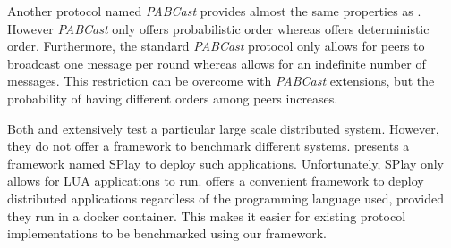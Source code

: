 Another protocol named \textit{PABCast} \autocite{felber2002} provides almost the same properties as \epto. However \textit{PABCast} only offers probabilistic order whereas \epto offers deterministic order. Furthermore, the standard \textit{PABCast} protocol only allows for peers to broadcast one message per round whereas \epto allows for an indefinite number of messages. This restriction can be overcome with \textit{PABCast} extensions, but the probability of having different orders among peers increases.

Both \autocite{Chandra2007} and \autocite{Maia2011} extensively test a particular large scale distributed system. However, they do not offer a framework to benchmark different systems. \autocite{Leonini2009} presents a framework named SPlay to deploy such applications. Unfortunately, SPlay only allows for LUA applications to run. \eptotester offers a convenient framework to deploy distributed applications regardless of the programming language used, provided they run in a docker container. This makes it easier for existing protocol implementations to be benchmarked using our framework.
